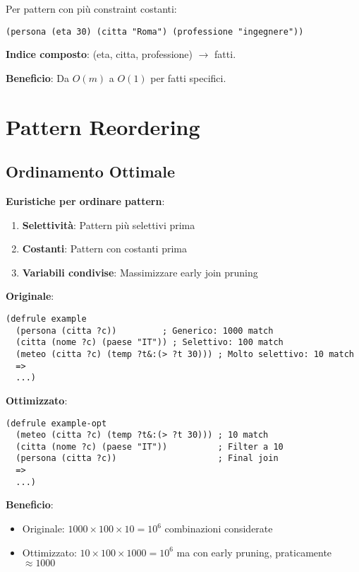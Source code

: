 Per pattern con più constraint costanti:

\begin{lstlisting}[language=CLIPS]
(persona (eta 30) (citta "Roma") (professione "ingegnere"))
\end{lstlisting}

\textbf{Indice composto}: (eta, citta, professione) $\rightarrow$ fatti.

\textbf{Beneficio}: Da $O(m)$ a $O(1)$ per fatti specifici.

\section{Pattern Reordering}

\subsection{Ordinamento Ottimale}

\textbf{Euristiche per ordinare pattern}:

\begin{enumerate}
\item \textbf{Selettività}: Pattern più selettivi prima
\item \textbf{Costanti}: Pattern con costanti prima
\item \textbf{Variabili condivise}: Massimizzare early join pruning
\end{enumerate}

\begin{esempio}[Riordinamento]
\textbf{Originale}:
\begin{lstlisting}[language=CLIPS]
(defrule example
  (persona (citta ?c))         ; Generico: 1000 match
  (citta (nome ?c) (paese "IT")) ; Selettivo: 100 match
  (meteo (citta ?c) (temp ?t&:(> ?t 30))) ; Molto selettivo: 10 match
  =>
  ...)
\end{lstlisting}

\textbf{Ottimizzato}:
\begin{lstlisting}[language=CLIPS]
(defrule example-opt
  (meteo (citta ?c) (temp ?t&:(> ?t 30))) ; 10 match
  (citta (nome ?c) (paese "IT"))          ; Filter a 10
  (persona (citta ?c))                    ; Final join
  =>
  ...)
\end{lstlisting}

\textbf{Beneficio}:
\begin{itemize}
\item Originale: $1000 \times 100 \times 10 = 10^6$ combinazioni considerate
\item Ottimizzato: $10 \times 100 \times 1000 = 10^6$ ma con early pruning, praticamente $\approx 1000$
\end{itemize}
\end{esempio}

